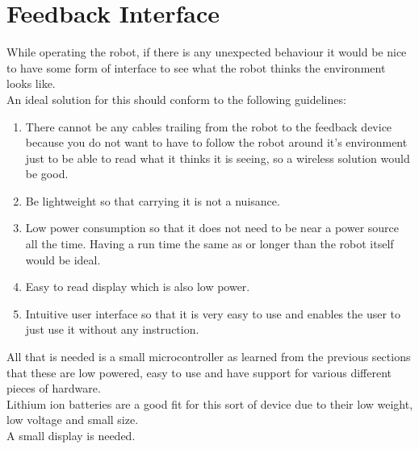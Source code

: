 \section{Feedback Interface}
While operating the robot, if there is any unexpected behaviour it would be nice to have some form of interface to see what the robot thinks the environment looks like.
\\An ideal solution for this should conform to the following guidelines:
\begin{enumerate}
\item There cannot be any cables trailing from the robot to the feedback device because you do not want to have to follow the robot around it's environment just to be able to read what it thinks it is seeing, so a wireless solution would be good.
\item Be lightweight so that carrying it is not a nuisance.
\item Low power consumption so that it does not need to be near a power source all the time.  Having a run time the same as or longer than the robot itself would be ideal.
\item Easy to read display which is also low power.
\item Intuitive user interface so that it is very easy to use and enables the user to just use it without any instruction.
\end{enumerate}
All that is needed is a small microcontroller as learned from the previous sections that these are low powered, easy to use and have support for various different pieces of hardware.
\\Lithium ion batteries are a good fit for this sort of device due to their low weight, low voltage and small size.
\\A small display is needed.
